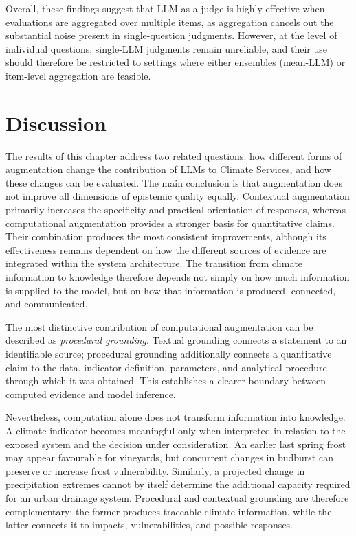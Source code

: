 Overall, these findings suggest that LLM-as-a-judge is highly effective when evaluations are aggregated over multiple items, as aggregation cancels out the substantial noise present in single-question judgments.
However, at the level of individual questions, single-LLM judgments remain unreliable, and their use should therefore be restricted to settings where either ensembles (mean-LLM) or item-level aggregation are feasible.

\section{Discussion}

The results of this chapter address two related questions: how different forms of augmentation change the contribution of LLMs to Climate Services, and how these changes can be evaluated. The main conclusion is that augmentation does not improve all dimensions of epistemic quality equally. Contextual augmentation primarily increases the specificity and practical orientation of responses, whereas computational augmentation provides a stronger basis for quantitative claims. Their combination produces the most consistent improvements, although its effectiveness remains dependent on how the different sources of evidence are integrated within the system architecture. The transition from climate information to knowledge therefore depends not simply on how much information is supplied to the model, but on how that information is produced, connected, and communicated.

The most distinctive contribution of computational augmentation can be described as \emph{procedural grounding}. Textual grounding connects a statement to an identifiable source; procedural grounding additionally connects a quantitative claim to the data, indicator definition, parameters, and analytical procedure through which it was obtained. This establishes a clearer boundary between computed evidence and model inference. 

Nevertheless, computation alone does not transform information into knowledge. A climate indicator becomes meaningful only when interpreted in relation to the exposed system and the decision under consideration. An earlier last spring frost may appear favourable for vineyards, but concurrent changes in budburst can preserve or increase frost vulnerability. Similarly, a projected change in precipitation extremes cannot by itself determine the additional capacity required for an urban drainage system. Procedural and contextual grounding are therefore complementary: the former produces traceable climate information, while the latter connects it to impacts, vulnerabilities, and possible responses.

